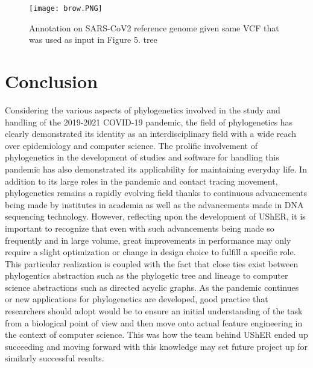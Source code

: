 \documentclass[12pt,journal,compsoc]{IEEEtran}
\begin{document}
\begin{figure}[H]
    \centering
    \texttt{[image: brow.PNG]}
    \caption{ 
    Annotation on SARS-CoV2 reference genome given same VCF that was used as input in Figure 5. tree\cite{ucsc:brow}}
\end{figure}


\section{Conclusion}
Considering the various aspects of phylogenetics involved in the study and handling of the 2019-2021 COVID-19 pandemic, the field of phylogenetics has clearly demonstrated its identity as an interdisciplinary field with a wide reach over epidemiology and computer science. The prolific involvement of phylogenetics in the development of studies and software for handling this pandemic has also demonstrated its applicability for maintaining everyday life.
In addition to its large roles in the pandemic and contact tracing movement, phylogenetics remains a rapidly evolving field thanks to continuous advancements being made by institutes in academia as well as the advancements made in DNA sequencing technology. However, reflecting upon the development of UShER, it is important to recognize that even with such advancements being made so frequently and in large volume, great improvements in performance may only require a slight optimization or change in design choice to fulfill a specific role. This particular realization is coupled with the fact that close ties exist between phylogentics abstraction such as the phylogetic tree and lineage to computer science abstractions such as directed acyclic graphs. As the pandemic continues or new applications for phylogenetics are developed, good practice that researchers should adopt would be to ensure an initial understanding of the task from a biological point of view and then move onto actual feature engineering in the context of computer science. This was how the team behind UShER ended up succeeding and moving forward with this knowledge may set future project up for similarly successful results. 





\end{document}
